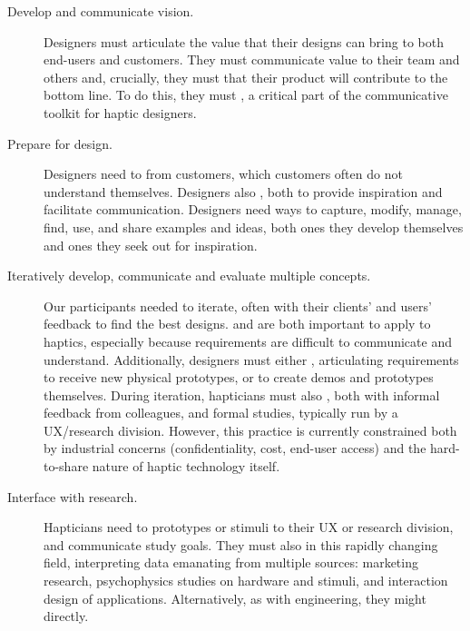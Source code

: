 \begin{description}
    \item[Develop and communicate vision.]
    Designers must articulate the value that their designs can bring to both end-users and customers.
    They must communicate value to their team and others and, crucially, %
    they must  that their product will contribute to the bottom line.
    To do this, they must , a critical part of the communicative toolkit for haptic designers.
    
    \item[Prepare for design.] Designers need to  from customers, which customers often do not understand themselves.
    Designers also , both to provide inspiration and facilitate communication.
    Designers need ways to capture, modify, manage, find, use, and share examples and ideas, both ones they develop themselves and ones they seek out for inspiration. 
    
    
    \item[Iteratively develop, communicate and evaluate multiple concepts.]
    Our participants needed to iterate, often with their clients' and users' feedback to find the best designs.
     and  %
    are both important to apply to haptics, especially because requirements are difficult to communicate and understand.
    Additionally, designers must either ,
    articulating requirements to receive new physical prototypes, or  to create demos and prototypes themselves.
    During iteration, hapticians must also ,
    both with informal feedback from colleagues, and formal studies, typically run by a UX/research division.
    However, this practice is currently constrained both by industrial concerns (confidentiality, cost, end-user access) and the hard-to-share nature of haptic technology itself.
    
    \item[Interface with research.]
    Hapticians need to  prototypes or stimuli to their UX or research division, and communicate study goals.
    They must also  in this rapidly changing field, interpreting data emanating from multiple sources: marketing research, psychophysics studies on hardware and stimuli, and interaction design of applications. 
    Alternatively, as with engineering, they might   directly.
    

\end{description}

